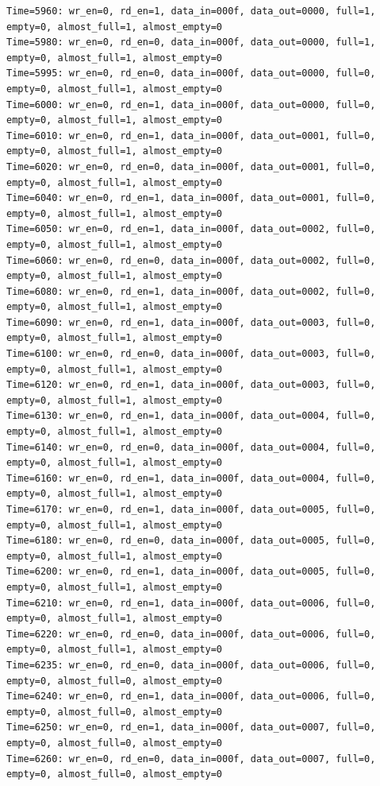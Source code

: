 \documentclass[UTF8]{ctexart}
\begin{document}
\begin{lstlisting}[frame=shadowbox]
Time=5960: wr_en=0, rd_en=1, data_in=000f, data_out=0000, full=1, empty=0, almost_full=1, almost_empty=0
Time=5980: wr_en=0, rd_en=0, data_in=000f, data_out=0000, full=1, empty=0, almost_full=1, almost_empty=0
Time=5995: wr_en=0, rd_en=0, data_in=000f, data_out=0000, full=0, empty=0, almost_full=1, almost_empty=0
Time=6000: wr_en=0, rd_en=1, data_in=000f, data_out=0000, full=0, empty=0, almost_full=1, almost_empty=0
Time=6010: wr_en=0, rd_en=1, data_in=000f, data_out=0001, full=0, empty=0, almost_full=1, almost_empty=0
Time=6020: wr_en=0, rd_en=0, data_in=000f, data_out=0001, full=0, empty=0, almost_full=1, almost_empty=0
Time=6040: wr_en=0, rd_en=1, data_in=000f, data_out=0001, full=0, empty=0, almost_full=1, almost_empty=0
Time=6050: wr_en=0, rd_en=1, data_in=000f, data_out=0002, full=0, empty=0, almost_full=1, almost_empty=0
Time=6060: wr_en=0, rd_en=0, data_in=000f, data_out=0002, full=0, empty=0, almost_full=1, almost_empty=0
Time=6080: wr_en=0, rd_en=1, data_in=000f, data_out=0002, full=0, empty=0, almost_full=1, almost_empty=0
Time=6090: wr_en=0, rd_en=1, data_in=000f, data_out=0003, full=0, empty=0, almost_full=1, almost_empty=0
Time=6100: wr_en=0, rd_en=0, data_in=000f, data_out=0003, full=0, empty=0, almost_full=1, almost_empty=0
Time=6120: wr_en=0, rd_en=1, data_in=000f, data_out=0003, full=0, empty=0, almost_full=1, almost_empty=0
Time=6130: wr_en=0, rd_en=1, data_in=000f, data_out=0004, full=0, empty=0, almost_full=1, almost_empty=0
Time=6140: wr_en=0, rd_en=0, data_in=000f, data_out=0004, full=0, empty=0, almost_full=1, almost_empty=0
Time=6160: wr_en=0, rd_en=1, data_in=000f, data_out=0004, full=0, empty=0, almost_full=1, almost_empty=0
Time=6170: wr_en=0, rd_en=1, data_in=000f, data_out=0005, full=0, empty=0, almost_full=1, almost_empty=0
Time=6180: wr_en=0, rd_en=0, data_in=000f, data_out=0005, full=0, empty=0, almost_full=1, almost_empty=0
Time=6200: wr_en=0, rd_en=1, data_in=000f, data_out=0005, full=0, empty=0, almost_full=1, almost_empty=0
Time=6210: wr_en=0, rd_en=1, data_in=000f, data_out=0006, full=0, empty=0, almost_full=1, almost_empty=0
Time=6220: wr_en=0, rd_en=0, data_in=000f, data_out=0006, full=0, empty=0, almost_full=1, almost_empty=0
Time=6235: wr_en=0, rd_en=0, data_in=000f, data_out=0006, full=0, empty=0, almost_full=0, almost_empty=0
Time=6240: wr_en=0, rd_en=1, data_in=000f, data_out=0006, full=0, empty=0, almost_full=0, almost_empty=0
Time=6250: wr_en=0, rd_en=1, data_in=000f, data_out=0007, full=0, empty=0, almost_full=0, almost_empty=0
Time=6260: wr_en=0, rd_en=0, data_in=000f, data_out=0007, full=0, empty=0, almost_full=0, almost_empty=0

\end{lstlisting}
\end{document}
